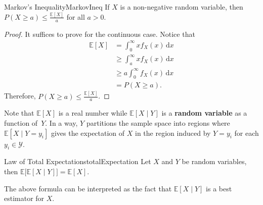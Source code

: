 \documentclass[math, code]{amznotes}
\theoremstyle{remark}
\renewcommand{\d}{\mathrm{d}}
\begin{document}
\begin{thmbox}{Markov's Inequality}{MarkovIneq}
    If $X$ is a non-negative random variable, then $P\left(X \geq a\right) \leq \frac{\mathbb{E}\left[X\right]}{a}$ for all $a > 0$.
    \tcblower
    \begin{proof}
        It suffices to prove for the continuous case. Notice that 
        \begin{align*}
            \mathbb{E}\left[X\right] & = \int_{0}^{\infty}\!xf_X\left(x\right)\,\d x \\
            & \geq \int_{a}^{\infty}\!xf_X\left(x\right)\,\d x \\
            & \geq a\int_{0}^{\infty}\!f_X\left(x\right)\,\d x \\
            & = P\left(X \geq a\right).
        \end{align*}
        Therefore, $P\left(X \geq a\right) \leq \frac{\mathbb{E}\left[X\right]}{a}$.
    \end{proof}
\end{thmbox}
Note that $\mathbb{E}\left[X\right]$ is a real number while $\mathbb{E}\left[X \mid Y\right]$ is a \textbf{random variable} as a function of~$Y$. In a way, $Y$ partitions the sample space into regions where $\mathbb{E}\left[X \mid Y = y_i\right]$ gives the expectation of $X$ in the region induced by $Y = y_i$ for each $y_i \in \mathcal{Y}$.
\begin{thmbox}{Law of Total Expectations}{totalExpectation}
    Let $X$ and $Y$ be random variables, then $\mathbb{E}\bigl[\mathbb{E}\left[X \mid Y\right]\bigr] = \mathbb{E}\left[X\right]$.
\end{thmbox}
The above formula can be interpreted as the fact that $\mathbb{E}\left[X \mid Y\right]$ is a best estimator for $X$.
\end{document}
